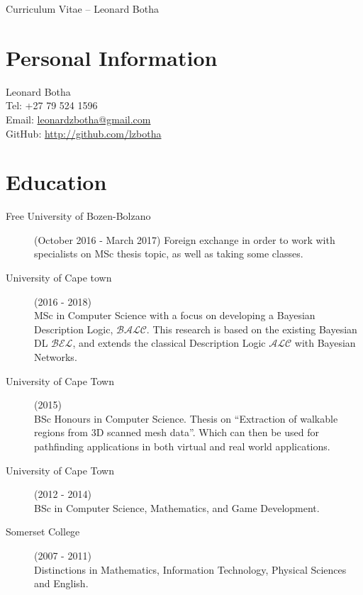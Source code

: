 \documentclass[margin,line,a4paper]{resume}
\begin{document}
    {\sc \Large Curriculum Vitae -- Leonard Botha}
    \begin{resume}
        \vspace{0.5cm}

        \section{\mysidestyle Personal Information}
            Leonard Botha\\
            Tel: +27 79 524 1596\\
            Email: \href{mailto:leonardzbotha@gmail.com}{leonardzbotha@gmail.com}\\
            GitHub: \href{http://github.com/lzbotha}{http://github.com/lzbotha}\\

        \section{\mysidestyle Education}
            \begin{description}
                \item[Free University of Bozen-Bolzano] (October 2016 - March 2017)
                    Foreign exchange in order to work with specialists on MSc thesis topic, as well as taking some classes.

                \item[University of Cape town] (2016 - 2018)\\
                    MSc in Computer Science with a focus on developing a Bayesian Description Logic, $\mathcal{BALC}$. This research is based on the existing Bayesian DL $\mathcal{BEL}$, and extends the classical Description Logic $\mathcal{ALC}$ with Bayesian Networks.

                \item[University of Cape Town] (2015) \\
                    BSc Honours in Computer Science. Thesis on ``Extraction of  walkable regions from 3D scanned mesh data''.
                    Which can then be used for pathfinding applications in both virtual and real world applications.

                \item[University of Cape Town] (2012 - 2014) \\
                    BSc in Computer Science, Mathematics, and Game Development.

                \item[Somerset College](2007 - 2011)\\
                    Distinctions in Mathematics, Information Technology, Physical Sciences and English.
            \end{description}



\end{resume}
\end{document}
